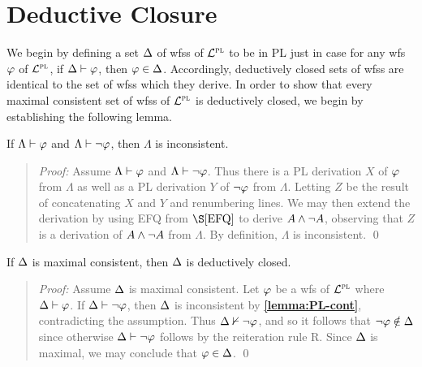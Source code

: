 \section{Deductive Closure}%
  \label{sec:DeductiveClosure}

We begin by defining a set $\Delta$ of wfss of $\mathcal{L}^{\textsc{pl}}$ to be  in PL just in case for any wfs $\varphi$ of $\mathcal{L}^{\textsc{pl}}$, if $\Delta\vdash\varphi$, then $\varphi\in\Delta$.
Accordingly, deductively closed sets of wfss are identical to the set of wfss which they derive.
In order to show that every maximal consistent set of wfss of $\mathcal{L}^{\textsc{pl}}$ is deductively closed, we begin by establishing the following lemma.

\begin{Lthm} \label{lemma:PL-cont}
  If $\Lambda\vdash\varphi$ and $\Lambda\vdash\neg\varphi$, then $\Lambda$ is inconsistent. 
\end{Lthm} \vspace{-.2in}

\begin{quote} 
  \textit{Proof:} 
  Assume $\Lambda\vdash\varphi$ and $\Lambda\vdash\neg\varphi$.
  Thus there is a PL derivation $X$ of $\varphi$ from $\Lambda$ as well as a PL derivation $Y$ of $\neg\varphi$ from $\Lambda$. 
  Letting $Z$ be the result of concatenating $X$ and $Y$ and renumbering lines.
  We may then extend the derivation by using EFQ from $\S\ref{EFQ}$ to derive $A\wedge\neg A$, observing that $Z$ is a derivation of $A\wedge\neg A$ from $\Lambda$.
  By definition, $\Lambda$ is inconsistent.
  \qed
\end{quote}
  




\begin{Lthm} \label{lemma:PL-deductive}
  If $\Delta$ is maximal consistent, then $\Delta$ is deductively closed.
\end{Lthm} \vspace{-.2in}

\begin{quote} 
  \textit{Proof:} Assume $\Delta$ is maximal consistent.
  Let $\varphi$ be a wfs of $\mathcal{L}^{\textsc{pl}}$ where $\Delta\vdash\varphi$.
  If $\Delta\vdash\neg\varphi$, then $\Delta$ is inconsistent by \textbf{\ref{lemma:PL-cont}}, contradicting the assumption.
  Thus $\Delta\nvdash\neg\varphi$, and so it follows that $\neg\varphi\notin\Delta$ since otherwise $\Delta\vdash\neg\varphi$ follows by the reiteration rule R. 
  Since $\Delta$ is maximal, we may conclude that $\varphi\in\Delta$. 
  \qed
\end{quote}

